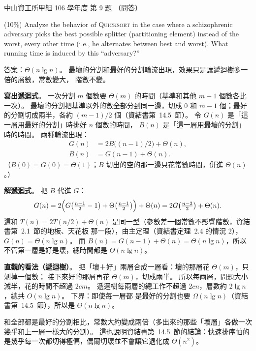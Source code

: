 \begin{pastexam}[label={px:nsysu-106-osds-04}]{中山資工所甲組 106 學年度 第 9 題}
（問答）

(10\%) Analyze the behavior of \textsc{Quicksort} in the case where a schizophrenic adversary picks
the best possible splitter (partitioning element) instead of the worst, every other time (i.e., he
alternates between best and worst). What running time is induced by this ``adversary?''
\end{pastexam}

\begin{pastsoln}
答案：$\Theta(n \lg n)$。 最壞的分割和最好的分割輪流出現，效果只是讓遞迴樹多一倍的層數，常數變大，
階數不變。

\textbf{寫出遞迴式}。 一次分割 $m$ 個數要 $\Theta(m)$ 的時間（基準和其他 $m - 1$ 個數各比一次）。
最壞的分割把基準以外的數全部分到同一邊，切成 $0$ 和 $m - 1$ 個；最好的分割切成兩半，各約
$(m-1)/2$ 個（資結書第~14.5~節）。 令 $G(n)$ 是「這一層用最好的分割」時排好 $n$ 個數的時間，
$B(n)$ 是「這一層用最壞的分割」時的時間。 兩種輪流出現：
\begin{align*}
G(n) &= 2B\bigl((n-1)/2\bigr) + \Theta(n),\\
B(n) &= G(n - 1) + \Theta(n).
\end{align*}
（$B(0) = G(0) = \Theta(1)$；$B$ 切出的空的那一邊只花常數時間，併進 $\Theta(n)$。）

\textbf{解遞迴式}。 把 $B$ 代進 $G$：
\[
G(n) = 2\Bigl(G\bigl(\tfrac{n-1}{2} - 1\bigr) + \Theta\bigl(\tfrac{n-1}{2}\bigr)\Bigr) + \Theta(n)
= 2G\bigl(\tfrac{n-3}{2}\bigr) + \Theta(n).
\]
這和 $T(n) = 2T(n/2) + \Theta(n)$ 是同一型（參數差一個常數不影響階數，資結書第~2.1~節的地板、天花板
那一段），由主定理（資結書定理~2.4 的情況 2），$G(n) = \Theta(n \lg n)$。 而
$B(n) = G(n-1) + \Theta(n) = \Theta(n \lg n)$，所以不管第一層是好是壞，總時間都是
$\Theta(n \lg n)$。

\textbf{直觀的看法（遞迴樹）}。 把「壞＋好」兩層合成一層看：壞的那層花 $\Theta(m)$，只剝掉一個數；
接下來好的那層再花 $\Theta(m)$，切成兩半。 所以每兩層，問題大小減半，花的時間不超過
$2cm$。 遞迴樹每兩層的總工作不超過 $2cn$，層數約 $2\lg n$，總共 $O(n \lg n)$。 下界：即使每一層都
是最好的分割也要 $\Omega(n \lg n)$（資結書第~14.5~節），所以是 $\Theta(n \lg n)$。

和全部都是最好的分割相比，常數大約變成兩倍（多出來的那些「壞層」各做一次幾乎和上一層一樣大的分割）。
這也說明資結書第~14.5~節的結論：快速排序怕的是幾乎每一次都切得極偏，偶爾切壞並不會讓它退化成
$\Theta(n^2)$。
\end{pastsoln}
